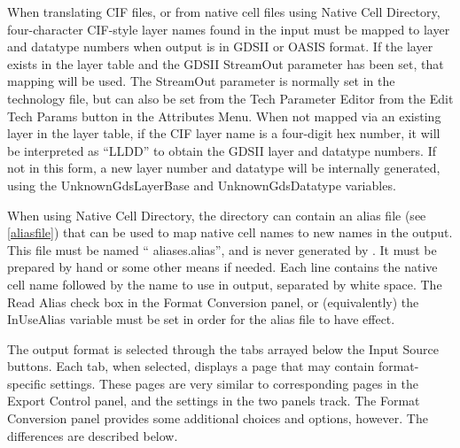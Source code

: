 When translating CIF files, or from native cell files using {\cb
Native Cell Directory}, four-character CIF-style layer names found in
the input must be mapped to layer and datatype numbers when output is
in GDSII or OASIS format.  If the layer exists in the layer table and
the GDSII {\vt StreamOut} parameter has been set, that mapping will be
used.  The {\vt StreamOut} parameter is normally set in the technology
file, but can also be set from the {\cb Tech Parameter Editor} from
the {\cb Edit Tech Params} button in the {\cb Attributes Menu}.  When
not mapped via an existing layer in the layer table, if the CIF layer
name is a four-digit hex number, it will be interpreted as ``LLDD'' to
obtain the GDSII layer and datatype numbers.  If not in this form, a
new layer number and datatype will be internally generated, using the
{\et UnknownGdsLayerBase} and {\et UnknownGdsDatatype} variables.

When using {\cb Native Cell Directory}, the directory can contain an
alias file (see \ref{aliasfile}) that can be used to map native cell
names to new names in the output.  This file must be named ``{\vt
aliases.alias}'', and is never generated by {\Xic}.  It must be
prepared by hand or some other means if needed.  Each line contains
the native cell name followed by the name to use in output, separated
by white space.  The {\cb Read Alias} check box in the {\cb Format
Conversion} panel, or (equivalently) the {\cb InUseAlias} variable
must be set in order for the alias file to have effect.

The output format is selected through the tabs arrayed below the {\cb
Input Source} buttons.  Each tab, when selected, displays a page that
may contain format-specific settings.  These pages are very similar to
corresponding pages in the {\cb Export Control} panel, and the
settings in the two panels track.  The {\cb Format Conversion} panel
provides some additional choices and options, however.  The
differences are described below.

